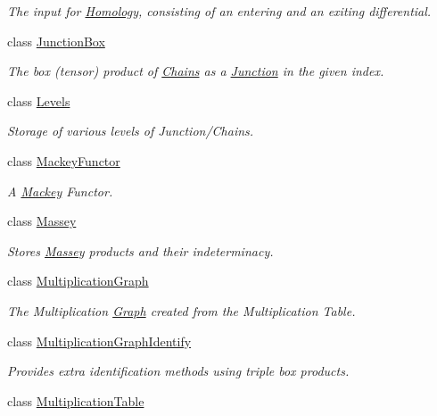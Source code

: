 \begin{DoxyCompactItemize}
\begin{DoxyCompactList}\small\item\em The input for \hyperlink{classMackey_1_1Homology}{Homology}, consisting of an entering and an exiting differential. \end{DoxyCompactList}\item 
class \hyperlink{classMackey_1_1JunctionBox}{Junction\+Box}
\begin{DoxyCompactList}\small\item\em The box (tensor) product of \hyperlink{classMackey_1_1Chains}{Chains} as a \hyperlink{classMackey_1_1Junction}{Junction} in the given index. \end{DoxyCompactList}\item 
class \hyperlink{classMackey_1_1Levels}{Levels}
\begin{DoxyCompactList}\small\item\em Storage of various levels of Junction/\+Chains. \end{DoxyCompactList}\item 
class \hyperlink{classMackey_1_1MackeyFunctor}{Mackey\+Functor}
\begin{DoxyCompactList}\small\item\em A \hyperlink{namespaceMackey}{Mackey} Functor. \end{DoxyCompactList}\item 
class \hyperlink{classMackey_1_1Massey}{Massey}
\begin{DoxyCompactList}\small\item\em Stores \hyperlink{classMackey_1_1Massey}{Massey} products and their indeterminacy. \end{DoxyCompactList}\item 
class \hyperlink{classMackey_1_1MultiplicationGraph}{Multiplication\+Graph}
\begin{DoxyCompactList}\small\item\em The Multiplication \hyperlink{classMackey_1_1Graph}{Graph} created from the Multiplication Table. \end{DoxyCompactList}\item 
class \hyperlink{classMackey_1_1MultiplicationGraphIdentify}{Multiplication\+Graph\+Identify}
\begin{DoxyCompactList}\small\item\em Provides extra identification methods using triple box products. \end{DoxyCompactList}\item 
class \hyperlink{classMackey_1_1MultiplicationTable}{Multiplication\+Table}

\end{DoxyCompactItemize}
